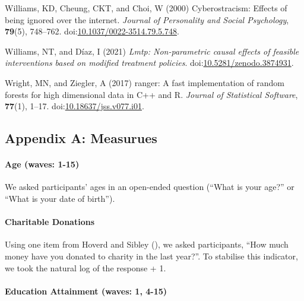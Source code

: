 \documentclass[
  singlecolumn]{article}
\let\oldparagraph\paragraph
\renewcommand{\paragraph}[1]{\oldparagraph{#1}\mbox{}}
\newlength{\cslhangindent}
\newenvironment{CSLReferences}[2] %
 {\begin{list}{}{%
  \setlength{\itemindent}{0pt}
  \setlength{\leftmargin}{0pt}
  \setlength{\parsep}{0pt}
  \ifodd #1
   \setlength{\leftmargin}{\cslhangindent}
   \setlength{\itemindent}{-1\cslhangindent}
  \fi
  \setlength{\itemsep}{#2\baselineskip}}}
 {\end{list}}
\begin{document}
\begin{CSLReferences}{1}{0}
Williams, KD, Cheung, CKT, and Choi, W (2000) Cyberostracism: Effects of
being ignored over the internet. \emph{Journal of Personality and Social
Psychology}, \textbf{79}(5), 748--762.
doi:\href{https://doi.org/10.1037/0022-3514.79.5.748}{10.1037/0022-3514.79.5.748}.

Williams, NT, and Díaz, I (2021) \emph{Lmtp: Non-parametric causal
effects of feasible interventions based on modified treatment policies}.
doi:\href{https://doi.org/10.5281/zenodo.3874931}{10.5281/zenodo.3874931}.

Wright, MN, and Ziegler, A (2017) {ranger}: A fast implementation of
random forests for high dimensional data in {C++} and {R}. \emph{Journal
of Statistical Software}, \textbf{77}(1), 1--17.
doi:\href{https://doi.org/10.18637/jss.v077.i01}{10.18637/jss.v077.i01}.

\end{CSLReferences}

\newpage{}

\subsection{Appendix A: Measurues}\label{appendix-measures}

\paragraph{Age (waves: 1-15)}\label{age-waves-1-15}

We asked participants' ages in an open-ended question (``What is your
age?'' or ``What is your date of birth'').

\paragraph{Charitable Donations}\label{charitable-donations}

Using one item from Hoverd and Sibley
(), we asked participants,
``How much money have you donated to charity in the last year?''. To
stabilise this indicator, we took the natural log of the response + 1.

\paragraph{Education Attainment (waves: 1,
4-15)}\label{education-attainment-waves-1-4-15}
\end{document}

